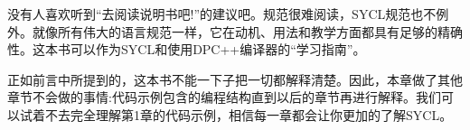 没有人喜欢听到“去阅读说明书吧!”的建议吧。规范很难阅读，SYCL规范也不例外。就像所有伟大的语言规范一样，它在动机、用法和教学方面都具有足够的精确性。这本书可以作为SYCL和使用DPC++编译器的“学习指南”。\par

正如前言中所提到的，这本书不能一下子把一切都解释清楚。因此，本章做了其他章节不会做的事情:代码示例包含的编程结构直到以后的章节再进行解释。我们可以试着不去完全理解第1章的代码示例，相信每一章都会让你更加的了解SYCL。\par







